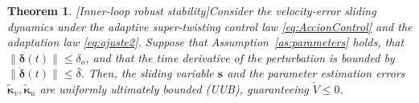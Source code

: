 \documentclass[sn-mathphys-num]{sn-jnl}
\theoremstyle{thmstyleone}%
\newtheorem{theorem}{Theorem}%
\theoremstyle{thmstyletwo}%
\theoremstyle{thmstylethree}%
\begin{document}
\begin{theorem}
[Inner-loop robust stability]\label{th:inner}
Consider the velocity-error sliding dynamics under the adaptive super-twisting control law \eqref{eq:AccionControl} and the adaptation law \eqref{eq:ajuste2}. Suppose that Assumption~\ref{as:parameters} holds, that $\|\boldsymbol{\delta}(t)\| \le \delta_o$, and that the time derivative of the perturbation is bounded by $\|\dot{\boldsymbol{\delta}}(t)\|\le\bar{\delta}$. Then, the sliding variable $\mathbf{s}$ and the parameter estimation errors $\tilde{\boldsymbol{\kappa}}_v, \tilde{\boldsymbol{\kappa}}_u$ are uniformly ultimately bounded (UUB), guaranteeing $\dot{V}\le 0$.

\end{theorem}
\end{document}
